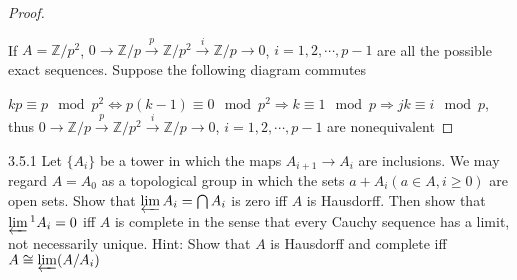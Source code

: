 \documentclass[../main.tex]{subfiles}
\begin{document}
\begin{proof}
\begin{center}
\end{center}
If $A=\mathbb Z/p^2$, $0\to\mathbb Z/p\xrightarrow{p}\mathbb Z/p^2\xrightarrow i\mathbb Z/p\to0$, $i=1,2,\cdots,p-1$ are all the possible exact sequences. Suppose the following diagram commutes
\begin{center}
\end{center}
$kp\equiv p\mod p^2\Leftrightarrow p(k-1)\equiv0\mod p^2\Rightarrow k\equiv1\mod p\Rightarrow jk\equiv i\mod p$, thus $0\to\mathbb Z/p\xrightarrow{p}\mathbb Z/p^2\xrightarrow i\mathbb Z/p\to0$, $i=1,2,\cdots,p-1$ are nonequivalent
\end{proof}

\begin{customexercise}{3.5.1}
Let $\{A_i\}$ be a tower in which the maps $A_{i+1}\to A_i$ are inclusions. We may regard $A=A_0$ as a topological group in which the sets $a+A_i(a\in A,i\geq0)$ are open sets. Show that $\varprojlim A_i=\bigcap A_i$ is zero iff $A$ is Hausdorff. Then show that $\varprojlim\textstyle^1A_i=0$ iff $A$ is complete in the sense that every Cauchy sequence has a limit, not necessarily unique. Hint: Show that $A$ is Hausdorff and complete iff $A\cong\varprojlim(A/A_i)$
\end{customexercise}
\end{document}
